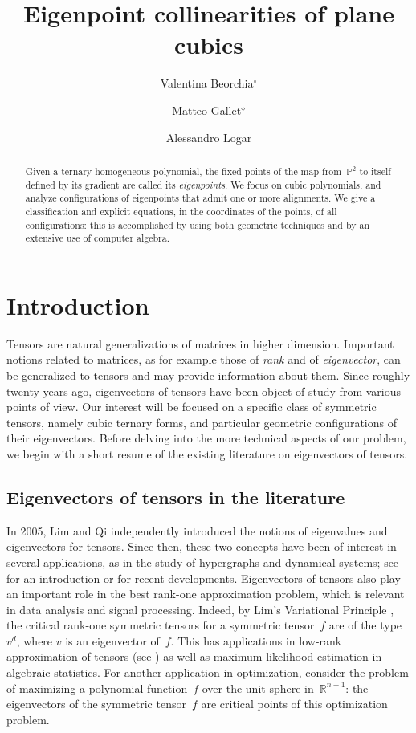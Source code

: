 \documentclass[a4paper, 11pt, reqno]{amsart}
\title{Eigenpoint collinearities of plane cubics}
\author[Valentina Beorchia]{Valentina Beorchia$^{\circ}$}
\author[Matteo Gallet]{Matteo Gallet$^{\diamond}$}
\author[Alessandro Logar]{Alessandro Logar}
\date{}
\theoremstyle{plain}
\theoremstyle{definition}
\newcommand{\R}{\mathbb{R}}
\newcommand{\p}{\mathbb{P}}
\begin{document}
\begin{abstract}
 Given a ternary homogeneous polynomial, the fixed points of the map from~$\p^2$ to itself defined by its gradient are called its \emph{eigenpoints}. We focus on cubic polynomials, and analyze configurations of eigenpoints that admit one or more alignments. We give a classification and explicit equations, in the coordinates of the points, of all configurations: this is accomplished by using both geometric techniques and by an extensive use of computer algebra.
\end{abstract}

\maketitle


\section{Introduction}
\label{introduction}

Tensors are natural generalizations of matrices in higher dimension.
Important notions related to matrices, as for example those of \emph{rank} and of \emph{eigenvector},
can be generalized to tensors and may provide information about them.
Since roughly twenty years ago, eigenvectors of tensors have been object of study from various points of view.
Our interest will be focused on a specific class of symmetric tensors, namely cubic ternary forms, and particular geometric configurations of their eigenvectors.
Before delving into the more technical aspects of our problem,
we begin with a short resume of the existing literature on eigenvectors of tensors.

\subsection*{Eigenvectors of tensors in the literature}
In 2005, Lim \cite{Lim} and Qi \cite{Qi} independently introduced the notions of eigenvalues and eigenvectors for tensors.
Since then, these two concepts have been of interest in several applications,
as in the study of hypergraphs and dynamical systems;
see \cite[Section~4]{QZ} for an introduction or \cite{GMV} for recent developments.
Eigenvectors of tensors also play an important role in the best rank-one approximation problem,
which is relevant in data analysis and signal processing.
Indeed, by Lim's Variational Principle \cite{Lim}, the critical rank-one symmetric tensors for a symmetric tensor~$f$ are of the type~$v^d$, where $v$ is an eigenvector of~$f$.
This has applications in low-rank approximation of tensors (see \cite{OttSod}) as well as maximum likelihood estimation in algebraic statistics.
For another application in optimization, consider the problem of maximizing a polynomial function~$f$ over the unit sphere in~$\R^{n+1}$:
the eigenvectors of the symmetric tensor~$f$ are critical points of this optimization problem.
\end{document}

